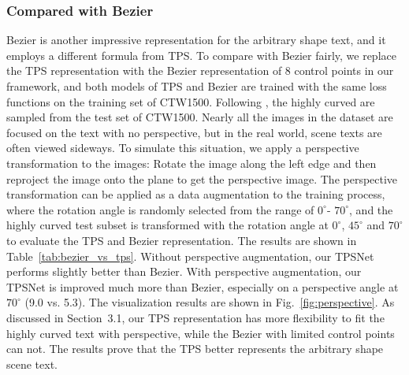 \documentclass[sigconf]{acmart}
\begin{document}
	\subsubsection{Compared with Bezier}
	Bezier is another impressive representation for the arbitrary shape text, and it employs a  different formula from TPS. To compare with Bezier fairly, we replace the TPS representation with the Bezier representation of 8 control points in our framework, and both models of TPS and Bezier are trained with the same loss functions on the training set of CTW1500. Following  \cite{zhu2021fourier}, the highly curved are sampled from the test set of CTW1500. Nearly all the images in the dataset are focused on the text with no perspective, but in the real world, scene texts are often viewed sideways. To simulate this situation, we apply a perspective transformation to the images: Rotate the image along the left edge and then reproject the image onto the plane to get the perspective image. The perspective transformation can be applied as a data augmentation to the training process, where the rotation angle is randomly selected from the range of $0^\circ$- $70^\circ$, and the highly curved test subset is transformed with the rotation angle at $0^\circ$, $45^\circ$ and $70^\circ$ to evaluate the TPS and Bezier representation. The results are shown in Table~\ref{tab:bezier_vs_tps}. Without perspective augmentation, our TPSNet performs slightly better than Bezier. With perspective augmentation, our TPSNet is improved much more than Bezier, especially on a perspective angle at $70^\circ$ (9.0 vs. 5.3). The visualization results are shown in Fig.~\ref{fig:perspective}. As discussed in Section~3.1, our TPS representation has more flexibility to fit the highly curved text with perspective, while the Bezier with limited control points can not. The results prove that the TPS better represents the arbitrary shape scene text.
	
	
\end{document}
